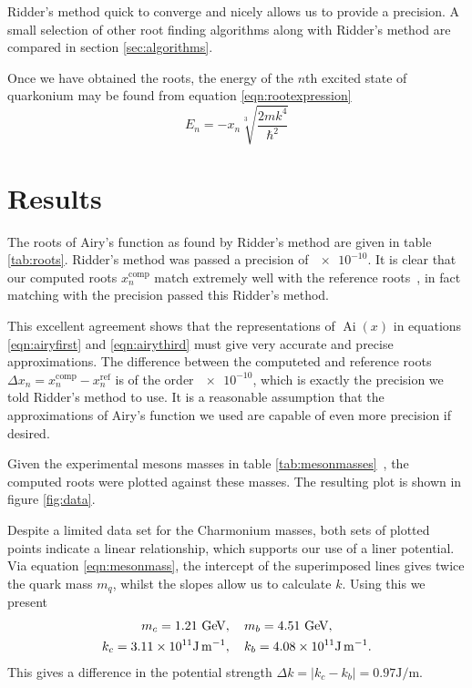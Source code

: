 \documentclass[]{article}
\renewcommand{\mod}[1]{\ensuremath{\lvert {#1} \rvert}}
\newcommand{\Ai}[1]{\ensuremath{\operatorname{Ai}({#1})}}
\begin{document}
Ridder's method quick to converge and nicely allows us to provide a precision. A small selection of other root finding algorithms along with Ridder's method are compared in section \ref{sec:algorithms}.

Once we have obtained the roots, the energy of the $n$th excited state of quarkonium may be found from equation \ref{eqn:rootexpression}
\begin{equation}
E_{n} = -x_{n} \sqrt[3]{\frac{2mk^{4}}{\hbar^{2}}}
\end{equation}

\section{Results}\label{sec:results}

The roots of Airy's function as found by Ridder's method are given in table \ref{tab:roots}.   Ridder's method was passed a precision of $\num{e-10}$. It is clear that our computed roots $x_{n}^{\mathrm{comp}}$ match extremely well with the reference roots~\cite{ref:abramowitz}, in fact matching with the precision passed this Ridder's method.

This excellent agreement shows that the representations of \Ai{x} in equations \ref{eqn:airyfirst} and \ref{eqn:airythird} must give very accurate and precise approximations. The difference between the computeted and reference roots $\Delta x_{n} = x_{n}^{\mathrm{comp}} - x_{n}^{\mathrm{ref}}$ is of the order $\num{e-10}$, which is exactly the precision we told Ridder's method to use. It is a reasonable assumption that the approximations of Airy's function we used are capable of even more precision if desired.\footnotemark


Given the experimental mesons masses in table \ref{tab:mesonmasses}~\cite{ref:gdaniell}, the computed roots were plotted against these masses. The resulting plot is shown in figure \ref{fig:data}.

Despite a limited data set for the Charmonium masses, both sets of plotted points indicate a linear relationship, which supports our use of a liner potential. Via equation \ref{eqn:mesonmass}, the intercept of the superimposed lines gives twice the quark mass $m_{q}$, whilst the slopes allow us to calculate $k$. Using this we present
\begin{align*}
m_{c} = 1.21\GeV&,\quad m_{b} = 4.51\GeV,\\
k_{c} = \num{3.11e11}\si{\joule\per\metre}&,\quad k_{b} = \num{4.08e11}\si{\joule\per\metre}.
\end{align*}
This gives a difference in the potential strength $\Delta k = \mod{k_{c} - k_{b}} = 0.97\si{\joule\per\metre}$.
\end{document}

